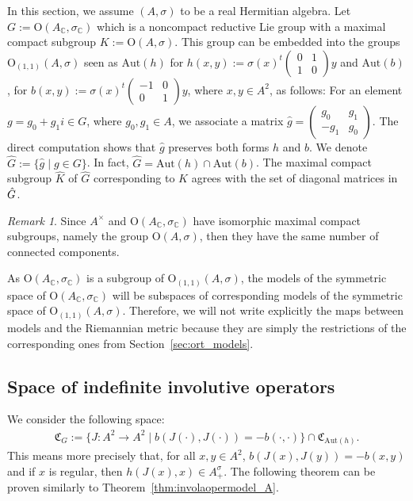 \documentclass[oneside,11pt]{amsart}
\theoremstyle{definition}
\theoremstyle{remark}
\newtheorem{rem}[thm]{Remark}
\numberwithin{thm}{section}
\numberwithin{equation}{section}
\begin{document}
In this section, we assume $(A,\sigma)$ to be a real Hermitian algebra. Let $G:=\mathrm{O}(A_\mathbb C,\sigma_\mathbb C)$ which is a noncompact reductive Lie group with a maximal compact subgroup $K:=\mathrm{O}(A,\sigma)$. This group can be embedded into the groups $\mathrm{O}_{(1,1)}(A,\sigma)$ seen as $\mathrm{Aut}(h)$ for $h(x,y):=\sigma(x)^t\begin{pmatrix}
    0 & 1 \\
    1 & 0
\end{pmatrix}y$ and $\mathrm{Aut}(b)$, for $b(x,y):=\sigma(x)^t\begin{pmatrix}
    -1 & 0 \\
    0 & 1
\end{pmatrix}y$,
where $x,y\in A^2$, as follows: For an element $g=g_0
+g_1i\in G$, where $g_0,g_1\in A$, we associate a matrix $\hat g=\begin{pmatrix}
    g_0 & g_1\\
    -g_1 & g_0
\end{pmatrix}$. The direct computation shows that $\hat g$ preserves both forms $h$ and $b$. We denote $\hat G:=\{\hat g\mid g\in G\}$. In fact, $\hat G=\mathrm{Aut}(h)\cap \mathrm{Aut}(b)$. The maximal compact subgroup $\hat K$ of $\hat G$ corresponding to $K$ agrees with the set of diagonal matrices in $\Hat G$. 

\begin{rem}
    Since $A^\times$ and $\mathrm{O}(A_\mathbb C,\sigma_\mathbb C)$ have isomorphic maximal compact subgroups, namely the group $\mathrm{O}(A,\sigma)$, then they have the same number of connected components.
\end{rem}

As $\mathrm{O}(A_\mathbb C,\sigma_\mathbb C)$ is a subgroup of $\mathrm{O}_{(1,1)}(A,\sigma)$, the models of the symmetric space of $\mathrm{O}(A_\mathbb C,\sigma_\mathbb C)$ will be subspaces of corresponding models of the symmetric space of $\mathrm{O}_{(1,1)}(A,\sigma)$. Therefore, we will not write explicitly the maps between models and the Riemannian metric because they are simply the restrictions of the corresponding ones from Section~\ref{sec:ort_models}.

\subsection{Space of indefinite involutive operators}\label{sec:indefinite_OC}

We consider the following space: 
\begin{align*}
\mathfrak{C}_G :=\{J\colon A^2\to A^2 \mid b(J(\cdot),J(\cdot))=-b(\cdot,\cdot)\}\cap \mathfrak{C}_{\mathrm{Aut}(h)}.
\end{align*}
This means more precisely that, for all $x,y\in A^2$,  $b(J(x),J(y))=-b(x,y)$ and if $x$ is regular, then $h(J(x),x)\in A^{\sigma}_+$. The following theorem can be proven similarly to Theorem~\ref{thm:involaopermodel_A}.
\end{document}
